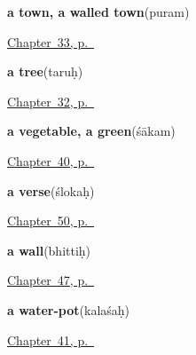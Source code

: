 \noindent\begin{minipage}[t]{\linewidth}
\raggedright
\textbf{a town, a walled town}\enspace\emph{}\enspace(puram)\par
\footnotesize \hyperref[ch:sa-land]{Chapter~33, p.~\pageref*{ch:sa-land}}
\end{minipage}\par\smallskip

\noindent\begin{minipage}[t]{\linewidth}
\raggedright
\textbf{a tree}\enspace\emph{}\enspace(taruḥ)\par
\footnotesize \hyperref[ch:sa-tree]{Chapter~32, p.~\pageref*{ch:sa-tree}}
\end{minipage}\par\smallskip

\noindent\begin{minipage}[t]{\linewidth}
\raggedright
\textbf{a vegetable, a green}\enspace\emph{}\enspace(śākam)\par
\footnotesize \hyperref[ch:sa-in-the-kitchen]{Chapter~40, p.~\pageref*{ch:sa-in-the-kitchen}}
\end{minipage}\par\smallskip

\noindent\begin{minipage}[t]{\linewidth}
\raggedright
\textbf{a verse}\enspace\emph{}\enspace(ślokaḥ)\par
\footnotesize \hyperref[ch:sa-sound-and-song]{Chapter~50, p.~\pageref*{ch:sa-sound-and-song}}
\end{minipage}\par\smallskip

\noindent\begin{minipage}[t]{\linewidth}
\raggedright
\textbf{a wall}\enspace\emph{}\enspace(bhittiḥ)\par
\footnotesize \hyperref[ch:sa-parts-of-a-house]{Chapter~47, p.~\pageref*{ch:sa-parts-of-a-house}}
\end{minipage}\par\smallskip

\noindent\begin{minipage}[t]{\linewidth}
\raggedright
\textbf{a water-pot}\enspace\emph{}\enspace(kalaśaḥ)\par
\footnotesize \hyperref[ch:sa-things-people-make]{Chapter~41, p.~\pageref*{ch:sa-things-people-make}}
\end{minipage}\par\smallskip

